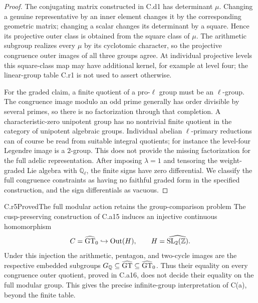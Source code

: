 \begin{proof}
The conjugating matrix constructed in C.d1 has determinant $\mu$.
Changing a genuine representative by an inner element changes it by
the corresponding geometric matrix; changing a scalar changes its
determinant by a square. Hence its projective outer class is obtained
from the square class of $\mu$. The arithmetic subgroup realizes every
$\mu$ by its cyclotomic character, so the projective congruence outer
images of all three groups agree. At individual projective levels this
square-class map may have additional kernel, for example at level four;
the linear-group table C.r1 is not used to assert otherwise.

For the graded claim, a finite quotient of a pro-$\ell$ group must be
an $\ell$-group. The congruence image modulo an odd prime generally has
order divisible by several primes, so there is no factorization through
that completion. A characteristic-zero unipotent group has no
nontrivial finite quotient in the category of unipotent algebraic
groups. Individual abelian $\ell$-primary reductions can of course be
read from suitable integral quotients; for instance the level-four
Legendre image is a $2$-group. This does not provide the missing
factorization for the full adelic representation. After imposing
$\lambda=1$ and tensoring the weight-graded Lie algebra with
$\mathbb Q_\ell$, the finite signs have zero differential. We classify
the full congruence constraints as having no faithful graded form in
the specified construction, and the sign differentials as vacuous.
\end{proof}


\begin{claim}{C.r5}{Proved}{The full modular action retains the group-comparison problem}
The cusp-preserving construction of C.a15 induces an injective continuous
homomorphism
\[
 C=\widehat{\mathrm{GT}}_0\hookrightarrow\operatorname{Out}(H),\qquad
 H=\widehat{\operatorname{SL}_2(\mathbb Z)}.
\]
Under this injection the arithmetic, pentagon, and two-cycle images are
the respective embedded subgroups $G_\mathbb Q\subseteq\widehat{\mathrm{GT}}\subseteq\widehat{\mathrm{GT}}_0$.
Thus their equality on every congruence outer quotient, proved in C.a16,
does not decide their equality on the full modular group. This gives
the precise infinite-group interpretation of C(a), beyond the finite table.
\end{claim}

